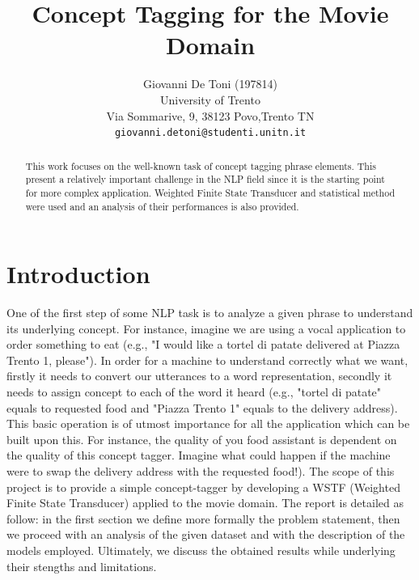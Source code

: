 \documentclass[11pt,a4paper]{article}
\title{Concept Tagging for the Movie Domain}
\author{Giovanni De Toni (197814) \\
  University of Trento \\ Via Sommarive, 9, 38123 Povo,Trento TN\\
  \texttt{giovanni.detoni@studenti.unitn.it}}
\date{}
\begin{document}
\maketitle

\begin{abstract}
This work focuses on the well-known task of concept tagging phrase elements.
This present a relatively important challenge in the NLP field since it is
the starting point for more complex application. Weighted Finite State Transducer
and statistical method were used and an analysis of their performances is also provided.
\end{abstract}

\section{Introduction}
One of the first step of some NLP task is to analyze a given phrase to understand its underlying concept. For instance, imagine we are using a vocal application to order something to eat (e.g., "I would like a tortel di patate delivered at Piazza Trento 1, please"). In order for a machine to understand correctly what we want, firstly it needs to convert our utterances to a word representation, secondly it needs to assign concept to each of the word it heard (e.g., "tortel di patate" equals to requested food and "Piazza Trento 1" equals to the delivery address).
This basic operation is of utmost importance for all the application which can be built upon this. For instance, the quality of you food assistant is dependent on the quality of this concept tagger. Imagine what could happen if the machine were to swap the delivery address with the requested food!).  
The scope of this project is to provide a simple concept-tagger by developing a WSTF (Weighted Finite State Transducer) applied to the movie domain.
The report is detailed as follow: in the first section we define more formally the problem statement, then we proceed with an analysis of the given dataset and with the description of the models employed. Ultimately, we discuss the obtained results while underlying their stengths and limitations. 
\end{document}
